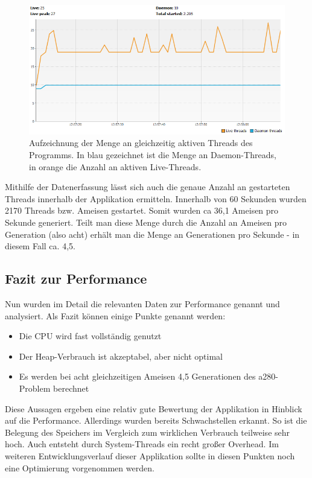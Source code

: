\begin{figure}[h]
	\centering
	\includegraphics[width=0.9\linewidth]{images/threadUsage.png}
	\caption{Aufzeichnung der Menge an gleichzeitig aktiven Threads des Programms. In blau gezeichnet ist die Menge an Daemon-Threads, in orange die Anzahl an aktiven Live-Threads.}
	\label{threadUsage}
\end{figure}

Mithilfe der Datenerfassung lässt sich auch die genaue Anzahl an gestarteten Threads innerhalb der Applikation ermitteln. Innerhalb von 60 Sekunden wurden 2170 Threads bzw. Ameisen gestartet. Somit wurden ca 36,1 Ameisen pro Sekunde generiert. Teilt man diese Menge durch die Anzahl an Ameisen pro Generation (also acht) erhält man die Menge an Generationen pro Sekunde - in diesem Fall ca. 4,5.

\subsection{Fazit zur Performance}
Nun wurden im Detail die relevanten Daten zur Performance genannt und analysiert. Als Fazit können einige Punkte genannt werden:
\begin{itemize}
	\item Die CPU wird fast vollständig genutzt
	\item Der Heap-Verbrauch ist akzeptabel, aber nicht optimal
	\item Es werden bei acht gleichzeitigen Ameisen 4,5 Generationen des a280-Problem berechnet
\end{itemize}
Diese Aussagen ergeben eine relativ gute Bewertung der Applikation in Hinblick auf die Performance. Allerdings wurden bereits Schwachstellen erkannt. So ist die Belegung des Speichers im Vergleich zum wirklichen Verbrauch teilweise sehr hoch. Auch entsteht durch System-Threads ein recht großer Overhead. Im weiteren Entwicklungsverlauf dieser Applikation sollte in diesen Punkten noch eine Optimierung vorgenommen werden.